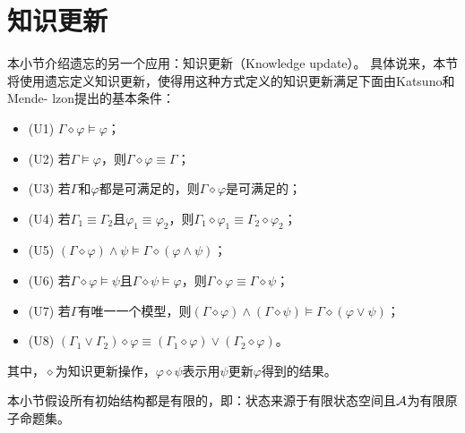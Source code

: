 \section{知识更新}\label{chapter04:sec:update}
本小节介绍遗忘的另一个应用：知识更新（Knowledge update）。
具体说来，本节将使用遗忘定义知识更新，使得用这种方式定义的知识更新满足下面由Katsuno和Mende- lzon提出的基本条件\cite{katsuno91mendelzon}：
\begin{itemize}
	\item (U1)  $\Gamma \diamond \varphi \models \varphi$；
	\item (U2) 若$\Gamma \models \varphi$，则$\Gamma \diamond \varphi \equiv \Gamma$；
	\item (U3) 若$\Gamma$和$\varphi$都是可满足的，则$\Gamma \diamond \varphi$是可满足的；
	\item (U4) 若$\Gamma_1\equiv \Gamma_2$且$\varphi_1 \equiv \varphi_2$，则$\Gamma_1 \diamond \varphi_1 \equiv \Gamma_2 \diamond \varphi_2$；
	\item (U5) $(\Gamma \diamond \varphi) \wedge \psi \models \Gamma \diamond(\varphi \wedge \psi)$；
	\item (U6) 若$\Gamma \diamond \varphi \models \psi$且$\Gamma \diamond \psi \models \varphi$，则$\Gamma \diamond \varphi \equiv \Gamma \diamond \psi$；
	\item (U7) 若$\Gamma$有唯一一个模型，则$(\Gamma \diamond \varphi) \wedge (\Gamma \diamond \psi) \models \Gamma \diamond (\varphi \vee \psi)$；
	\item (U8) $(\Gamma_1 \vee \Gamma_2) \diamond \varphi \equiv (\Gamma_1 \diamond \varphi) \vee  (\Gamma_2 \diamond \varphi)$。
\end{itemize}
其中，$\diamond$为知识更新操作，$\varphi \diamond \psi$表示用$\psi$更新$\varphi$得到的结果。

本小节假设所有初始结构都是有限的，即：状态来源于有限状态空间且${\cal A}$为有限原子命题集。

%	


